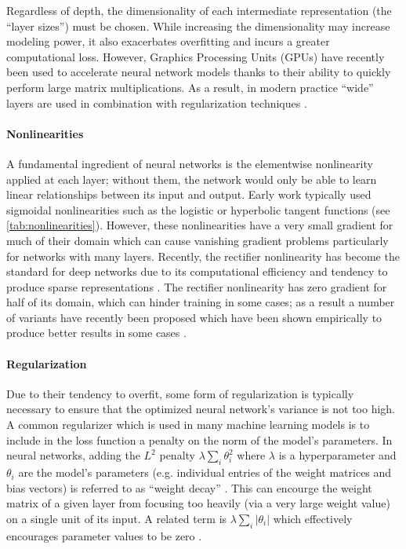 Regardless of depth, the dimensionality of each intermediate representation (the ``layer sizes'') must be chosen.
While increasing the dimensionality may increase modeling power, it also exacerbates overfitting and incurs a greater computational loss.
However, Graphics Processing Units (GPUs) have recently been used to accelerate neural network models thanks to their ability to quickly perform large matrix multiplications.
As a result, in modern practice ``wide'' layers are used in combination with regularization techniques \cite{bengio2012practical}.

\paragraph{Nonlinearities}

A fundamental ingredient of neural networks is the elementwise nonlinearity applied at each layer; without them, the network would only be able to learn linear relationships between its input and output.
Early work typically used sigmoidal nonlinearities such as the logistic or hyperbolic tangent functions (see \cref{tab:nonlinearities}).
However, these nonlinearities have a very small gradient for much of their domain which can cause vanishing gradient problems particularly for networks with many layers.
Recently, the rectifier nonlinearity has become the standard for deep networks due to its computational efficiency and tendency to produce sparse representations \cite{jarrett2009best,glorot2011deep,nair2010rectified}.
The rectifier nonlinearity has zero gradient for half of its domain, which can hinder training in some cases; as a result a number of variants have recently been proposed which have been shown empirically to produce better results in some cases \cite{maas2013rectifier,he2015delving}.

\paragraph{Regularization}

Due to their tendency to overfit, some form of regularization is typically necessary to ensure that the optimized neural network's variance is not too high.
A common regularizer which is used in many machine learning models is to include in the loss function a penalty on the norm of the model's parameters.
In neural networks, adding the $L^2$ penalty $\lambda \sum_i \theta_i^2$ where $\lambda$ is a hyperparameter and $\theta_i$ are the model's parameters (e.g. individual entries of the weight matrices and bias vectors) is referred to as ``weight decay'' \cite{hanson1989comparing}.
This can encourge the weight matrix of a given layer from focusing too heavily (via a very large weight value) on a single unit of its input.
A related term is $\lambda \sum_i |\theta_i|$ which effectively encourages parameter values to be zero \cite{bengio2012practical}.

